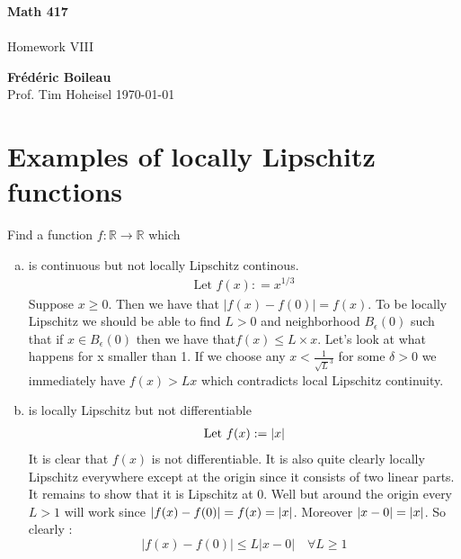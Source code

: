 \documentclass{article}
\DeclarePairedDelimiter{\abs}{\lvert}{\rvert}
\begin{document}
	\begin{titlepage}
		\begin{center}
			\vspace*{1cm}
			\textbf{Math 417}\\
			\\
			\vspace{0.5cm}
			Homework VIII
			
			\vspace{1.5cm}
			
			\textbf{Frédéric Boileau}\\
			\vspace{2cm}
			Prof. 
			Tim Hoheisel
			\vfill
			\today
			\thispagestyle{empty}
		\end{center}
	\end{titlepage}
	\newpage
	\tableofcontents
	\thispagestyle{empty}
	\clearpage
	
	\section{Examples of locally Lipschitz functions}
	Find a function $f:\mathbb R \rightarrow \mathbb R$ which
	\begin{enumerate}[(a)]
		\item is continuous but not locally Lipschitz continous. 
		\begin{align*}
			\text{Let }f(x) : = x^{1/3}
		\end{align*}
	Suppose $x \geq 0$. Then  we have that $\vert f(x) - f(0) \vert  = f(x)$. To be locally Lipschitz we should be able to find $L>0$  and neighborhood $B_\epsilon (0)$ such that if $x \in B_\epsilon(0)$ then we have that$f(x) \leq  L\times x$. Let's look at what happens for x smaller than 1. If we choose any $x  < \frac{1}{\sqrt{L}^3}$ for some $\delta >0$ we immediately have $f(x) > Lx$ which contradicts local Lipschitz continuity. 
	
	\item is locally Lipschitz but not differentiable 
	\begin{align*}
		\text{Let } f(x): = \abs x
	\end{align*}
	It is clear that $f(x)$ is not differentiable. It is also quite clearly locally Lipschitz everywhere except at the origin since it consists of two linear parts. It remains to show that it is Lipschitz at 0. Well but around the origin every $L >1 $ will work since $\vert f(x) - f(0) \vert = f(x) = \abs x$. Moreover $\vert x - 0 \vert = \abs x$. So clearly : 
	\begin{equation*}
		\vert f(x) - f(0) \vert \leq L \vert x - 0 \vert \quad \forall L \geq 1
	\end{equation*}
	
	\end{enumerate}
	
\end{document}
